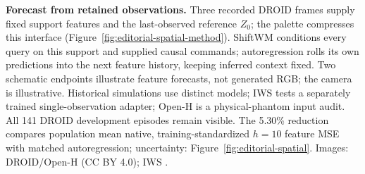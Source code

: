 \textbf{Forecast from retained observations.} Three recorded DROID frames supply fixed support features and the last-observed reference $Z_0$; the palette compresses this interface (Figure~\ref{fig:editorial-spatial-method}). ShiftWM conditions every query on this support and supplied causal commands; autoregression rolls its own predictions into the next feature history, keeping inferred context fixed. Two schematic endpoints illustrate feature forecasts, not generated RGB; the camera is illustrative. Historical simulations use distinct models; IWS tests a separately trained single-observation adapter; Open-H is a physical-phantom input audit. All 141 DROID development episodes remain visible. The 5.30\% reduction compares population mean native, training-standardized $h=10$ feature MSE with matched autoregression; uncertainty: Figure~\ref{fig:editorial-spatial}. Images: DROID/Open-H (CC BY 4.0); IWS \citep{zhang2026rlawm}.
